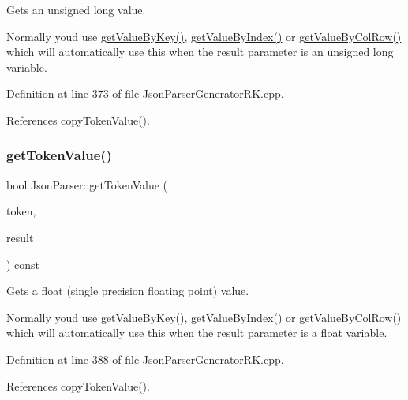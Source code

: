 Gets an unsigned long value. 

Normally you\textquotesingle{}d use \hyperlink{class_json_parser_a13abcdcb2341f65ac358bb4d81007d06}{get\+Value\+By\+Key()}, \hyperlink{class_json_parser_a53bd8a6ebb0d9b246b876653e792368f}{get\+Value\+By\+Index()} or \hyperlink{class_json_parser_af1f4a3a65b5cc9cd19b129c410aa78e0}{get\+Value\+By\+Col\+Row()} which will automatically use this when the result parameter is an unsigned long variable. 

Definition at line 373 of file Json\+Parser\+Generator\+R\+K.\+cpp.



References copy\+Token\+Value().

\mbox{\label{class_json_parser_a37a6ad66b9697ceb6b789b4c9abaa3ab}} 
\subsubsection{\texorpdfstring{get\+Token\+Value()}{getTokenValue()}\hspace{0.1cm}{\footnotesize\ttfamily [4/8]}}
{\footnotesize\ttfamily bool Json\+Parser\+::get\+Token\+Value (\begin{DoxyParamCaption}\item[{const \hyperlink{struct_json_parser_generator_r_k_1_1jsmntok__t}{Json\+Parser\+Generator\+R\+K\+::jsmntok\+\_\+t} $\ast$}]{token,  }\item[{float \&}]{result }\end{DoxyParamCaption}) const}



Gets a float (single precision floating point) value. 

Normally you\textquotesingle{}d use \hyperlink{class_json_parser_a13abcdcb2341f65ac358bb4d81007d06}{get\+Value\+By\+Key()}, \hyperlink{class_json_parser_a53bd8a6ebb0d9b246b876653e792368f}{get\+Value\+By\+Index()} or \hyperlink{class_json_parser_af1f4a3a65b5cc9cd19b129c410aa78e0}{get\+Value\+By\+Col\+Row()} which will automatically use this when the result parameter is a float variable. 

Definition at line 388 of file Json\+Parser\+Generator\+R\+K.\+cpp.



References copy\+Token\+Value().

